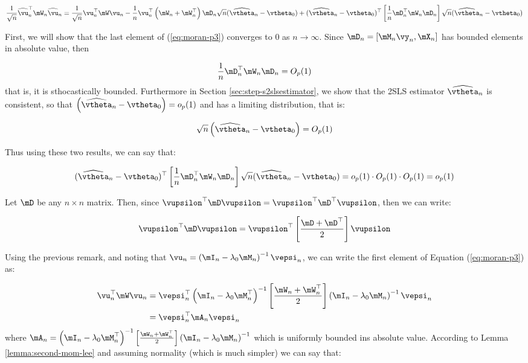 \documentclass[english,12pt]{book}\usepackage[]{graphicx}\usepackage[]{xcolor}
\begin{document}
\begin{subappendices}
\begin{equation}\label{eq:moran-p3}
\frac{1}{\sqrt{n}}\widehat{\vu}_n^\top\mW_n\widehat{\vu}_n= \frac{1}{\sqrt{n}}\vu_n^\top\mW\vu_n - \frac{1}{n}\vu_n^\top\left(\mW_n + \mW_n^\top\right)\mD_n\sqrt{n}(\widehat{\vtheta}_n - \vtheta_0)+(\widehat{\vtheta}_n - \vtheta_0)^\top\left[\frac{1}{n}\mD_n^\top\mW_n\mD_n\right]\sqrt{n}(\widehat{\vtheta}_n - \vtheta_0)
\end{equation}

First, we will show that the last element of (\ref{eq:moran-p3}) converges to 0 as $n\to \infty$. Since $\mD_n = \left[\mM_n\vy_n, \mX_n\right]$ has bounded elements in absolute value, then 

\begin{equation*}
\frac{1}{n}\mD_n^\top\mW_n\mD_n = O_p(1)
\end{equation*}
%
that is, it is sthocastically bounded. Furthermore in Section \ref{sec:step-s2slsestimator}, we show that the 2SLS estimator $\widehat{\vtheta}_n$ is consistent, so that $\left(\widehat{\vtheta}_n - \vtheta_0\right) = o_p(1)$ and has a limiting distribution, that is:

\begin{equation*}
\sqrt{n}\left(\widehat{\vtheta}_n - \vtheta_0\right) = O_p(1)
\end{equation*}

Thus using these two results, we can say that:

\begin{equation*}
(\widehat{\vtheta}_n - \vtheta_0)^\top\left[\frac{1}{n}\mD_n^\top\mW_n\mD_n\right]\sqrt{n}(\widehat{\vtheta}_n - \vtheta_0)= o_p(1)\cdot O_p(1)\cdot O_p(1) = o_p(1)
\end{equation*}

\begin{remark}
Let $\mD$ be any $n\times n$ matrix. Then, since $\vupsilon^\top\mD\vupsilon = \vupsilon^\top\mD^\top\vupsilon$, then we can write:

\begin{equation}
\vupsilon^\top\mD\vupsilon = \vupsilon^\top\left[\frac{\mD + \mD^\top}{2}\right]\vupsilon
\end{equation}
\end{remark}

Using the previous remark, and noting that $\vu_n = \left(\mI_n-\lambda_0\mM_n\right)^{-1}\vepsi_n$, we can write the first element of Equation (\ref{eq:moran-p3}) as:

\begin{equation}
\begin{aligned}
\vu_n^\top\mW\vu_n &=\vepsi_n^\top\left(\mI_n-\lambda_0\mM_n^\top\right)^{-1}\left[\frac{\mW_n + \mW_n^\top}{2}\right]\left(\mI_n-\lambda_0\mM_n\right)^{-1}\vepsi_n \\
& = \vepsi_n^\top\mA_n\vepsi_n
\end{aligned}
\end{equation}
%
where $\mA_n = \left(\mI_n-\lambda_0\mM_n^\top\right)^{-1}\left[\frac{\mW_n + \mW_n^\top}{2}\right]\left(\mI_n-\lambda_0\mM_n\right)^{-1}$ which is uniformly bounded ins absolute value. According to Lemma \ref{lemma:second-mom-lee} and assuming normality (which is much simpler) we can say that:


\end{subappendices}
\end{document}
